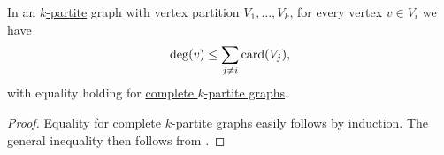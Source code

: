 \begin{lemma}\label{thm:multipartite_graph_degree}
  In an \hyperref[def:multipartite_graph]{\( k \)-partite} graph with vertex partition \( V_1, \ldots, V_k \), for every vertex \( v \in V_i \) we have
  \begin{equation*}
    \deg(v) \leq \sum_{j \neq i} \operatorname{card}(V_j),
  \end{equation*}
  with equality holding for \hyperref[def:complete_multipartite_graph]{complete \( k \)-partite graphs}.
\end{lemma}
\begin{proof}
  Equality for complete \( k \)-partite graphs easily follows by induction. The general inequality then follows from .
\end{proof}

